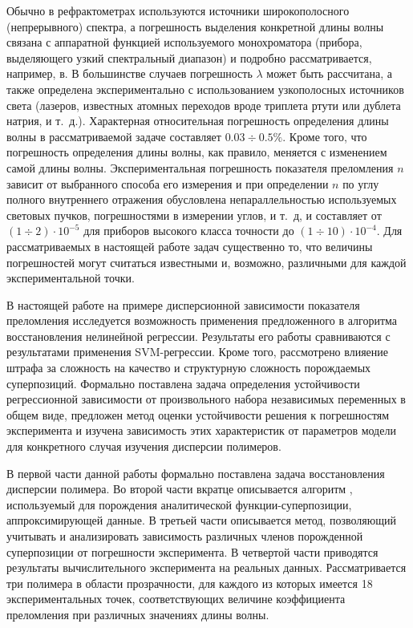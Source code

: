 \documentclass[12pt,a4paper]{article}
\theoremstyle{definition}
\begin{document}
Обычно в рефрактометрах используются источники широкополосного (непрерывного) спектра, а погрешность выделения конкретной длины волны связана с аппаратной функцией используемого монохроматора (прибора, выделяющего узкий спектральный диапазон) и подробно рассматривается, например, в\cite{Malishev79,Zaidel72}. В большинстве случаев погрешность $\lambda$ может быть рассчитана, а также определена экспериментально с использованием узкополосных источников света (лазеров, известных атомных переходов вроде триплета ртути или дублета натрия, и т.~д.). Характерная относительная погрешность определения длины волны в рассматриваемой задаче составляет $0.03 \div 0.5\%$. Кроме того, что погрешность определения длины волны, как правило, меняется с изменением самой длины волны. Экспериментальная погрешность показателя преломления $n$ зависит от выбранного способа его измерения и при определении $n$ по углу полного внутреннего отражения обусловлена непараллельностью используемых световых пучков, погрешностями в измерении углов, и т.~д, и составляет от $(1 \div 2) \cdot 10^{-5}$ для приборов высокого класса точности до $(1 \div 10) \cdot 10^{-4}$. Для рассматриваемых в настоящей работе задач существенно то, что величины погрешностей могут считаться известными и, возможно, различными для каждой экспериментальной точки.

В настоящей работе на примере дисперсионной зависимости показателя преломления исследуется возможность применения предложенного в \cite{Rudoy13} алгоритма восстановления нелинейной регрессии. Результаты его работы сравниваются с результатами применения SVM-регрессии. Кроме того, рассмотрено влияение штрафа за сложность на качество и структурную сложность порождаемых суперпозиций. Формально поставлена задача определения устойчивости регрессионной зависимости от произвольного набора независимых переменных в общем виде, предложен метод оценки устойчивости решения к погрешностям эксперимента и изучена зависимость этих характеристик от параметров модели для конкретного случая изучения дисперсии полимеров.

В первой части данной работы формально поставлена задача восстановления
дисперсии полимера. Во второй части вкратце описывается алгоритм \cite{Rudoy13},
используемый для порождения аналитической функции-суперпозиции, аппроксимирующей
данные. В третьей части описывается метод, позволяющий учитывать и анализировать
зависимость различных членов порожденной суперпозиции от погрешности
эксперимента. В четвертой части приводятся результаты вычислительного
эксперимента на реальных данных. Рассматривается три полимера в области прозрачности,
для каждого из которых имеется 18 экспериментальных точек,
соответствующих величине коэффициента преломления при различных значениях длины волны.
\end{document}
